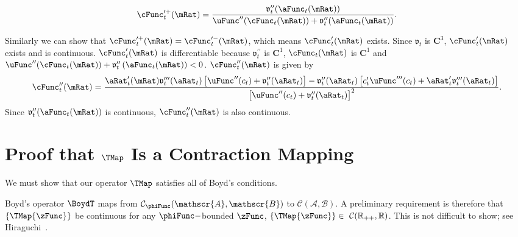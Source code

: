 \documentclass[\econtexRoot/BufferStockTheory.tex]{subfiles}
\begin{document}
\begin{equation*}
\cFunc_{t}^{\prime +}(\mRat)=\frac{\mathfrak{v}_{t}^{\prime \prime }({\aFunc}_{t}(\mRat))}{\uFunc^{\prime \prime
}(\cFunc_{t}(\mRat))+\mathfrak{v}_{t}^{\prime \prime }({\aFunc}_{t}(\mRat))}.
\end{equation*}

Similarly we can show that $\cFunc_{t}^{\prime +}(\mRat)=\cFunc_{t}^{\prime -}(\mRat)$,
which means $\cFunc_{t}^{\prime }(\mRat)$ exists. Since $\mathfrak{v}_{t}$ is
$\mathbf{C}^{3}$, $ \cFunc_{t}^{\prime }(\mRat)$ exists and is continuous.
$\cFunc_{t}^{\prime }(\mRat)$ is differentiable because
$\mathfrak{v}_{t}^{\prime \prime }$ is $\mathbf{C}^{1}$, $ \cFunc_{t}(\mRat)$
is $\mathbf{C}^{1}$ and $\uFunc^{\prime \prime
}(\cFunc_{t}(\mRat))+\mathfrak{v}_{t}^{\prime \prime }\left( {\aFunc}_{t}(\mRat)\right)
<0$. $\cFunc_{t}^{\prime \prime }(\mRat)$ is given by
\begin{equation}
\cFunc_{t}^{\prime \prime }(\mRat)=\frac{{\aRat}_{t}^{\prime }(\mRat)\mathfrak{v}_{t}^{\prime \prime
\prime }({\aRat}_{t})\left[ \uFunc^{\prime \prime }(c_{t})+\mathfrak{v}_{t}^{\prime \prime }({\aRat}_{t})
\right] -\mathfrak{v}_{t}^{\prime \prime }({\aRat}_{t})\left[ c_{t}^{\prime }\uFunc^{\prime \prime
\prime }(c_{t})+{\aRat}_{t}^{\prime }\mathfrak{v}_{t}^{\prime \prime \prime }({\aRat}_{t})\right] }{
\left[ \uFunc^{\prime \prime }(c_{t})+\mathfrak{v}_{t}^{\prime \prime }({\aRat}_{t})\right] ^{2}}.
\end{equation}
Since $\mathfrak{v}_{t}^{\prime \prime }({\aFunc}_{t}(\mRat))$ is continuous,
$\cFunc_{t}^{\prime \prime }(\mRat)$ is also continuous.

\hypertarget{It-Is-A-Contraction-Mapping}{}
\section{Proof that $\TMap$ Is a Contraction Mapping}\label{sec:Tcomplete}

We must show that our operator $\TMap$ satisfies all of Boyd's
conditions.

Boyd's operator $\BoydT$ maps from
$\mathcal{C}_{\phiFunc}(\mathscr{A},\mathscr{B})$ to
$\mathcal{C}(\mathscr{A},\mathscr{B}).$ A preliminary requirement is
therefore that $\{\TMap{\zFunc}\}$ be continuous for any $\phiFunc-$bounded $\zFunc$,
$\{\TMap{\zFunc}\}\in~\mathcal{C}(\mathbb{R}_{++},\mathbb{R})$.  This is not
difficult to show; see Hiraguchi~\citeyearpar{hiraguchiBSProofs}.
\end{document}
